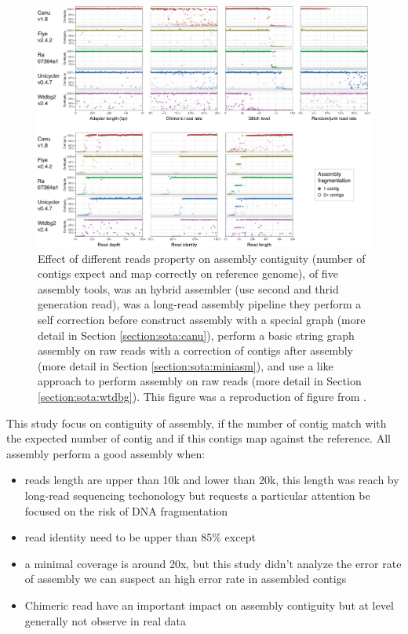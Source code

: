 \documentclass[./main.tex]{subfiles}
\begin{document}
\begin{figure}
    \centering
    \includegraphics[width=\textwidth]{introduction/images/rrwick_bench.png}
    \caption{Effect of different reads property on assembly contiguity (number of contigs expect and map correctly on reference genome), of five assembly tools,  was an hybrid assembler (use second and thrid generation read), \canu was a long-read assembly pipeline they perform a self correction before construct assembly with a special \OLC graph (more detail in Section \ref{section:sota:canu}),  perform a basic string graph assembly on raw reads with a correction of contigs after assembly (more detail in Section \ref{section:sota:miniasm}), \wtdbg and  use a \DBG like approach to perform assembly on raw reads (more detail in Section \ref{section:sota:wtdbg}). This figure was a reproduction of figure from \cite{long_read_assembler_comparison}.}
    \label{intro:fig:rrwick_bench}
\end{figure}

This study focus on contiguity of assembly, if the number of contig match with the expected number of contig and if this contigs map against the reference. All assembly perform a good assembly when:
\begin{itemize}
    \item reads length are upper than 10k and lower than 20k, this length was reach by long-read sequencing techonology but requests a particular attention be focused on the risk of DNA fragmentation
    \item read identity need to be upper than 85\% except
    \item a minimal coverage is around 20x, but this study didn't analyze the error rate of assembly we can suspect an high error rate in assembled contigs
    \item Chimeric read have an important impact on assembly contiguity but at level generally not observe in real data
\end{itemize}
\end{document}
